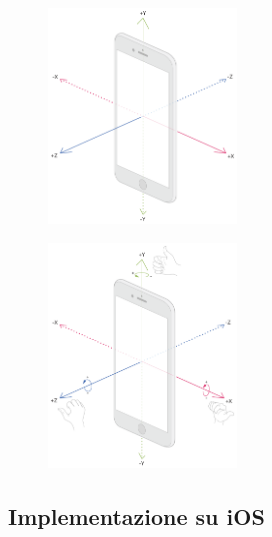 \begin{figure}
    \centering
    \begin{minipage}{.4\textwidth}
        \centering
        \includegraphics[width=5cm]{images/accelerometer_axes.png}
        \label{fig:accelerometer_axes}
    \end{minipage}
    \begin{minipage}{.4\textwidth}
        \centering
        \includegraphics[width=5cm]{images/gyroscope_axes.png}
        \label{fig:gyroscope_axes}
    \end{minipage}
\end{figure}

\subsection{Implementazione su iOS}

